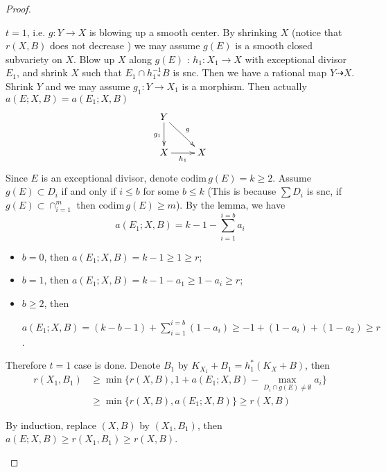 \documentclass{article}
\begin{document}
\begin{proof}
\begin{enumerate}[(1)]
		$ t=1 $, i.e. $ g:Y\to X $ is blowing up a smooth center. By shrinking $ X $ (notice that $ r(X,B) $ does not decrease ) we may assume $ g(E) $ is a smooth closed subvariety on $ X $. Blow up $ X $ along $ g(E) $ : $ h_1: X_1\to X $ with exceptional divisor $ E_1 $,  and  shrink $ X $ such that $ E_1\cap h^{-1}_{1*}B $ is snc. Then  we have a rational map $ Y\dashrightarrow X $. Shrink $ Y $ and we may assume $ g_1:Y\to X_1 $ is a morphism. Then actually $ a(E;X,B)=a(E_1;X,B) $
		$$ \xymatrix{
		Y\ar[d]_{g_1}\ar[rd]^g&\\
		X\ar[r]_{h_1}&X }$$
		Since $ E $ is an exceptional divisor,  denote $ \mathrm{codim}\, g(E)=k\geqslant 2 $. Assume $ g(E)\subset D_i  $ if and only if $ i\leqslant b $ for some $ b\leqslant k $ (This is because $ \sum D_i $ is snc, if $ g(E)\subset \cap_{i=1}^m $ then $ \mathrm{codim}\, g(E)\geqslant m $). By the lemma, we have 
		$$ a(E_1;X,B)=k-1-\sum_{i=1}^{i=b}a_i $$
		\begin{itemize}
			\item $ b=0 $, then $ a(E_1;X,B)=k-1\geqslant 1\geqslant r $;
			\item $ b=1 $, then $ a(E_1;X,B)=k-1-a_1\geqslant 1-a_i\geqslant r  $;
			\item $ b\geqslant 2 $, then 
			
			$ a(E_1;X,B)=(k-b-1)+\sum_{i=1}^{i=b}(1-a_i)\geqslant -1+(1-a_i)+(1-a_2)\geqslant r  $.
		\end{itemize}
	Therefore $ t=1 $ case is done. Denote $ B_1 $ by $ K_{X_1}+B_1=h_1^*(K_X+B) $, then
	\begin{equation*}
		\begin{aligned}
		r(X_1,B_1)&\geqslant\min\{ r(X,B),1+a(E_1;X,B)-\max_{D_i\cap g(E)\neq \emptyset}a_i  \}\\
					&\geqslant\min\{  r(X,B),  a(E_1;X,B) \}\geqslant r(X,B)
		\end{aligned}
	\end{equation*}
	
	By induction, replace $ (X,B) $ by $ (X_1,B_1) $, then $ a(E;X,B)\geqslant r(X_1,B_1)\geqslant r(X,B) $.
	\end{enumerate}
\end{proof}
\end{document}
